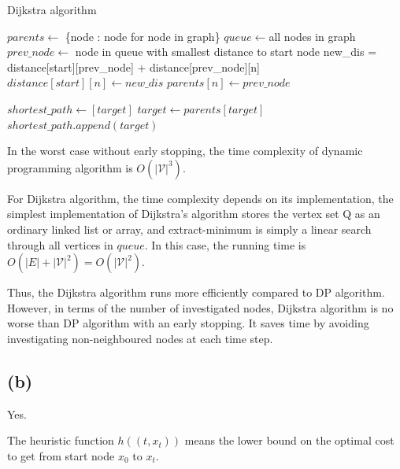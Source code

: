 \documentclass{article} %
\begin{document}
\begin{algorithm}
    \caption{Dijkstra algorithm}\label{euclid}
    \begin{algorithmic}[1]
    
    \State $parents \gets$ \{node : node for node in graph\}
    \State $queue \gets$all nodes in graph
        \State $ prev\_node \gets$ node in queue with smallest distance to start node
            \State new\_dis = distance[start][prev\_node] + distance[prev\_node][n]
                \State $distance[start][n] \gets new\_dis$
                \State $parents[n] \gets prev\_node$
            \EndIf
        \EndFor
    \EndWhile

    \State $shortest\_path \gets [target]$
        \State $target \gets parents[target]$
        \State $shortest\_path.append(target)$
    \EndWhile
    
    
    \EndProcedure
    \end{algorithmic}
\end{algorithm}

In the worst case without early stopping, the time complexity of dynamic programming algorithm is $O(|\mathcal{V}|^3)$. 

For Dijkstra algorithm, the time complexity depends on its implementation, the simplest implementation of Dijkstra's algorithm stores the vertex set Q as an ordinary linked list or array, and extract-minimum is simply a linear search through all vertices in $queue$. In this case, the running time is $O(|E| + |\mathcal{V}|^2) = O(|\mathcal{V}|^2)$.

Thus, the Dijkstra algorithm runs more efficiently compared to DP algorithm. However, in terms of the number of investigated nodes, Dijkstra algorithm is no worse than DP algorithm with an early stopping. It saves time by avoiding investigating non-neighboured nodes at each time step.

\subsection{(b)}

Yes.

The heuristic function $h((t, x_t))$ means the lower bound on the optimal cost to get from start node $x_0$ to $x_t$.
\end{document}
